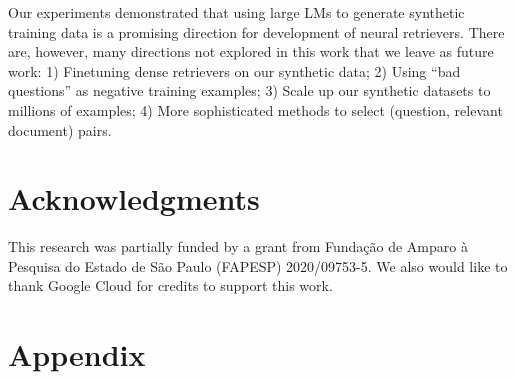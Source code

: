\documentclass[11pt]{article}
\begin{document}
Our experiments demonstrated that using large LMs to generate synthetic training data is a promising direction for development of neural retrievers.
There are, however, many directions not explored in this work that we leave as future work: 1) Finetuning dense retrievers on our synthetic data; 2) Using ``bad questions'' as negative training examples; 3) Scale up our synthetic datasets to millions of examples; 4) More sophisticated methods to select (question, relevant document) pairs.


\section*{Acknowledgments}
This research was partially funded by a grant from Fundação de Amparo à Pesquisa do Estado de São Paulo (FAPESP)
2020/09753-5.
We also would like to thank Google Cloud for credits to support this work.




\newpage
\appendix
\section{Appendix}
\end{document}
